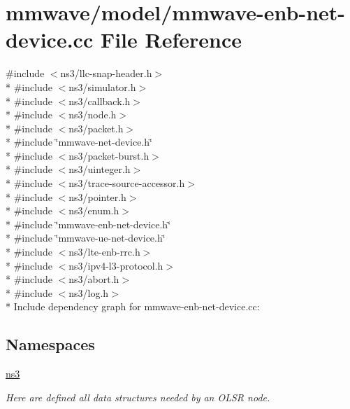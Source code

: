 \hypertarget{mmwave-enb-net-device_8cc}{}\section{mmwave/model/mmwave-\/enb-\/net-\/device.cc File Reference}
\label{mmwave-enb-net-device_8cc}
{\ttfamily \#include $<$ns3/llc-\/snap-\/header.\+h$>$}\\*
{\ttfamily \#include $<$ns3/simulator.\+h$>$}\\*
{\ttfamily \#include $<$ns3/callback.\+h$>$}\\*
{\ttfamily \#include $<$ns3/node.\+h$>$}\\*
{\ttfamily \#include $<$ns3/packet.\+h$>$}\\*
{\ttfamily \#include \char`\"{}mmwave-\/net-\/device.\+h\char`\"{}}\\*
{\ttfamily \#include $<$ns3/packet-\/burst.\+h$>$}\\*
{\ttfamily \#include $<$ns3/uinteger.\+h$>$}\\*
{\ttfamily \#include $<$ns3/trace-\/source-\/accessor.\+h$>$}\\*
{\ttfamily \#include $<$ns3/pointer.\+h$>$}\\*
{\ttfamily \#include $<$ns3/enum.\+h$>$}\\*
{\ttfamily \#include \char`\"{}mmwave-\/enb-\/net-\/device.\+h\char`\"{}}\\*
{\ttfamily \#include \char`\"{}mmwave-\/ue-\/net-\/device.\+h\char`\"{}}\\*
{\ttfamily \#include $<$ns3/lte-\/enb-\/rrc.\+h$>$}\\*
{\ttfamily \#include $<$ns3/ipv4-\/l3-\/protocol.\+h$>$}\\*
{\ttfamily \#include $<$ns3/abort.\+h$>$}\\*
{\ttfamily \#include $<$ns3/log.\+h$>$}\\*
Include dependency graph for mmwave-\/enb-\/net-\/device.cc\+:
\subsection*{Namespaces}
\begin{DoxyCompactItemize}
\item 
 \hyperlink{namespacens3}{ns3}
\begin{DoxyCompactList}\small\item\em Here are defined all data structures needed by an O\+L\+SR node. \end{DoxyCompactList}\end{DoxyCompactItemize}
